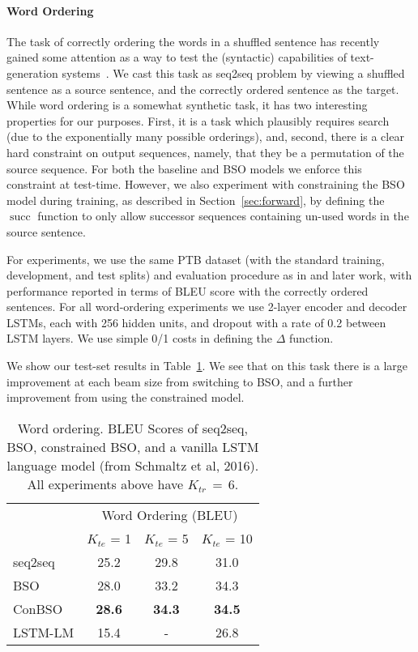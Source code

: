 \documentclass[11pt,letterpaper]{article}
\DeclareMathOperator{\suk}{succ}
\begin{document}
\paragraph{Word Ordering}
The task of correctly ordering the words in a shuffled sentence has recently gained some
attention as a way to test the (syntactic) capabilities of
text-generation
systems~\cite{zhang11syntax,zhang15discriminative,liu15transition,schmaltz16word}. 
We cast this task as seq2seq problem by viewing a shuffled sentence as
a source sentence, and the correctly ordered sentence as the
target. While word ordering is a somewhat synthetic task, it has two interesting properties for our purposes. First, it is a task which plausibly requires search (due to the exponentially many possible orderings), and, second, there is a clear hard constraint on output sequences, namely, that they be a permutation of the source sequence. For both the baseline and BSO models we
enforce this constraint at test-time. However, we also experiment with
constraining the BSO model during training, as described in Section~\ref{sec:forward}, by defining the $\suk$ function to only allow successor sequences containing un-used words in the source sentence.

For experiments, we use the same PTB dataset (with the standard training,
development, and test splits) and evaluation procedure as in
 and later work, with performance reported in terms of BLEU
score with the correctly ordered sentences. For all word-ordering
experiments we use 2-layer encoder and decoder LSTMs, each with 256
hidden units, and dropout with a rate of 0.2 between LSTM layers. We use simple 0/1 costs in defining the $\Delta$ function.  

We show our test-set results
in Table~\ref{tab:wo}. We see that on this task there is a large improvement at 
each beam size from switching to BSO, and a further improvement from using 
the constrained model.

\begin{table}
  \centering
  \begin{tabular}{lccc}
    \toprule
     & \multicolumn{3}{c}{Word Ordering (BLEU) } \\ 
          & $K_{te}$ = 1 & $K_{te}$ = 5 & $K_{te}$ = 10 \\ 
    \midrule
    seq2seq & 25.2 & 29.8 & 31.0 \\
    BSO     & 28.0 & 33.2 & 34.3 \\
    ConBSO & \textbf{28.6} & \textbf{34.3} & \textbf{34.5} \\
    \midrule
    LSTM-LM & 15.4 &  - & 26.8 \\
    \bottomrule
  \end{tabular}
  \caption{Word ordering. BLEU Scores of seq2seq, BSO, constrained BSO, and a vanilla LSTM language model (from Schmaltz et al, 2016). All experiments above have $K_{tr}\,{=}\,6$.}
  \label{tab:wo}
\end{table}
\end{document}
